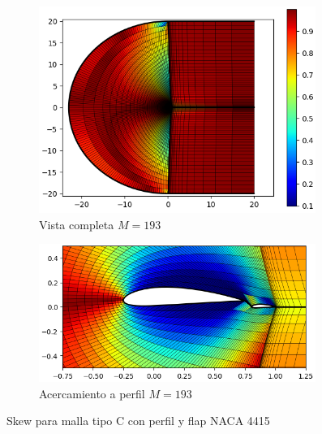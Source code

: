 \documentclass[letterpaper, openright, 12pt]{book}
\begin{document}
\begin{figure}[htbp!]
\begin{subfigure}[c]{0.48\textwidth}
            \includegraphics[keepaspectratio, width=0.99\textwidth]
                {./img/naca4415_c_flap_m_193_skew_far}
            \caption{Vista completa $M = 193$}
            \label{fig:naca4415_c_flap_m_193_skew_far}
        \end{subfigure}
        \hfill
        \begin{subfigure}[c]{0.48\textwidth}
            \includegraphics[keepaspectratio, width=0.99\textwidth]
                {./img/naca4415_c_flap_m_193_skew_close}
            \caption{Acercamiento a perfil $M = 193$}
        \end{subfigure}
        \caption{Skew para malla tipo C con perfil y flap NACA 4415}
        \label{fig:naca4415_c_flap_skew_0}
    \end{figure}
\end{document}
